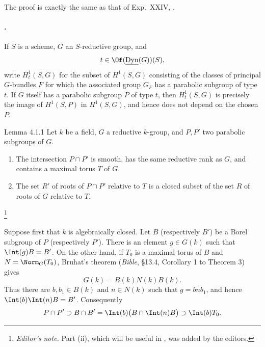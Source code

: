 The proof is exactly the same as that of Exp.\ XXIV, .

\paragraph{.}
If \(S\) is a scheme, \(G\) an \(S\)-reductive group, and
\[
 t\in\Of(\underline{\operatorname{Dyn}}(G))(S),
\]
write \(H^1_t(S,G)\) for the subset of \(H^1(S,G)\) consisting of the
classes of principal \(G\)-bundles \(F\) for which the associated group
\(G_F\) has a parabolic subgroup of type \(t\).  If \(G\) itself has a
parabolic subgroup \(P\) of type \(t\), then \(H^1_t(S,G)\) is precisely
the image of \(H^1(S,P)\) in \(H^1(S,G)\), and hence does not depend on
the chosen \(P\).




\begin{sgastatement}{Lemma 4.1.1}
Let \(k\) be a field, \(G\) a reductive \(k\)-group, and \(P,P'\) two
parabolic subgroups of \(G\).
\begin{enumerate}[label=\textup{(\roman*)}]
\item The intersection \(P\cap P'\) is smooth, has the same reductive
rank as \(G\), and contains a maximal torus \(T\) of \(G\).
\item The set \(R'\) of roots of \(P\cap P'\) relative to \(T\) is a
closed subset of the set \(R\) of roots of \(G\) relative to \(T\).
\end{enumerate}
\end{sgastatement}
\footnote{\emph{Editor's note.} Part \textup{(ii)}, which will be useful
in , was added by the editors.}

\SGAProof
Suppose first that \(k\) is algebraically closed.  Let \(B\) (respectively
\(B'\)) be a Borel subgroup of \(P\) (respectively \(P'\)).  There is an
element \(g\in G(k)\) such that \(\Int(g)B=B'\).  On the other hand, if
\(T_0\) is a maximal torus of \(B\) and \(N=\Norm_G(T_0)\), Bruhat's
theorem (\emph{Bible}, §13.4, Corollary 1 to Theorem 3) gives
\[
 G(k)=B(k)N(k)B(k).
\]
Thus there are \(b,b_1\in B(k)\) and \(n\in N(k)\) such that
\(g=bnb_1\), and hence
\(\Int(b)\Int(n)B=B'\).  Consequently
\[
 P\cap P'\supset B\cap B'
  =\Int(b)\bigl(B\cap\Int(n)B\bigr)
  \supset\Int(b)T_0.
\]

